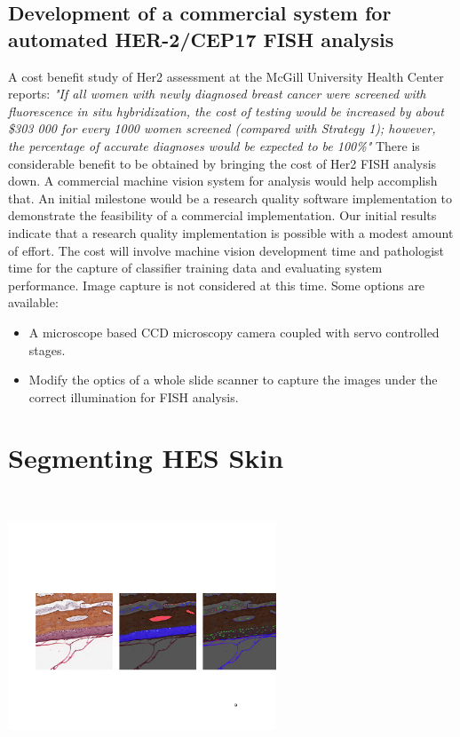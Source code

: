 \subsection{Development of a commercial system for automated HER-2/CEP17 FISH analysis}
A cost benefit study of Her2 assessment at the McGill University Health Center reports\cite{HER2FISH1}:
\emph{"If all women with newly diagnosed breast cancer were screened with fluorescence in situ hybridization, the cost of testing would be increased by about \$303 000 for every 1000 women screened (compared with Strategy 1); however, the percentage of accurate diagnoses would be expected to be 100\%"}
There is considerable benefit to be obtained by bringing the cost of Her2 FISH analysis down. A commercial machine vision system for analysis would help accomplish that. An initial milestone would be a research quality software implementation to demonstrate the feasibility of a commercial implementation.
Our initial results indicate that a research quality implementation is possible with a modest amount of effort. The cost will involve machine vision development time and pathologist time for the capture of classifier training data and evaluating system performance. Image capture is not considered at this time. Some options are available:
\begin{itemize}	
\item A microscope based CCD microscopy camera coupled with servo controlled stages.
\item 	Modify the optics of a whole slide scanner to capture the images under the correct illumination for FISH analysis.
\end{itemize}

\section{Segmenting HES Skin}
\includegraphics[width=8.0cm,height=8.0cm]{images/MachineVision/MachineVision_Pathology_ExampleSlides_Page_11.jpg}

